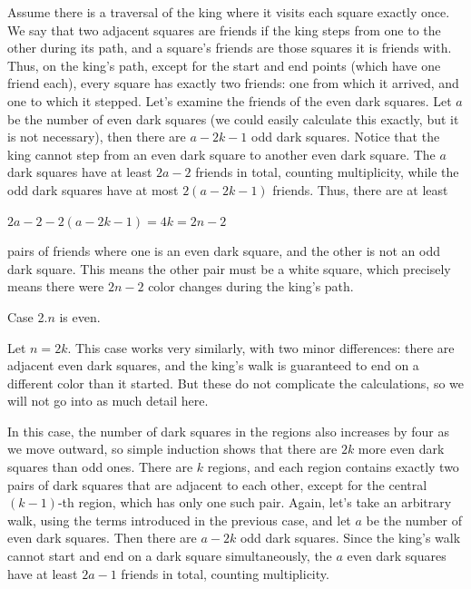 \documentclass{article}
\begin{document}
Assume there is a traversal of the king where it visits each square exactly once. We say that two adjacent squares are friends if the king steps from one to the other during its path, and a square's friends are those squares it is friends with. Thus, on the king's path, except for the start and end points (which have one friend each), every square has exactly two friends: one from which it arrived, and one to which it stepped. Let's examine the friends of the even dark squares. Let \(\displaystyle a\) be the number of even dark squares (we could easily calculate this exactly, but it is not necessary), then there are \(\displaystyle a-2k-1\) odd dark squares. Notice that the king cannot step from an even dark square to another even dark square. The \(\displaystyle a\) dark squares have at least \(\displaystyle 2a-2\) friends in total, counting multiplicity, while the odd dark squares have at most \(\displaystyle 2(a-2k-1)\) friends. Thus, there are at least

\(\displaystyle 2a-2-2(a-2k-1)=4k=2n-2\)

pairs of friends where one is an even dark square, and the other is not an odd dark square. This means the other pair must be a white square, which precisely means there were \(\displaystyle 2n-2\) color changes during the king's path.

Case 2.\(\displaystyle n\) is even.

Let \(\displaystyle n=2k\). This case works very similarly, with two minor differences: there are adjacent even dark squares, and the king's walk is guaranteed to end on a different color than it started. But these do not complicate the calculations, so we will not go into as much detail here.

In this case, the number of dark squares in the regions also increases by four as we move outward, so simple induction shows that there are \(\displaystyle 2k\) more even dark squares than odd ones. There are \(\displaystyle k\) regions, and each region contains exactly two pairs of dark squares that are adjacent to each other, except for the central \(\displaystyle (k-1)\)-th region, which has only one such pair. Again, let's take an arbitrary walk, using the terms introduced in the previous case, and let \(\displaystyle a\) be the number of even dark squares. Then there are \(\displaystyle a-2k\) odd dark squares. Since the king's walk cannot start and end on a dark square simultaneously, the \(\displaystyle a\) even dark squares have at least \(\displaystyle 2a-1\) friends in total, counting multiplicity.
\end{document}

